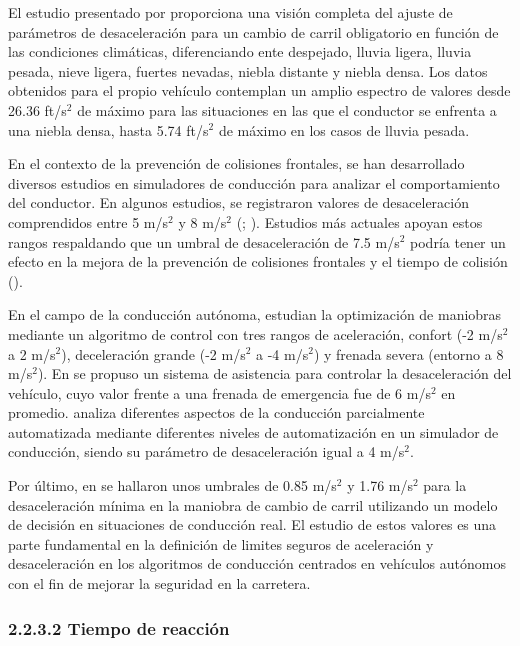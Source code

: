 El estudio presentado por \textcite{das} proporciona una visión completa del ajuste de parámetros de desaceleración para un cambio de carril obligatorio en función de las condiciones climáticas, diferenciando ente despejado, lluvia ligera, lluvia pesada, nieve ligera, fuertes nevadas, niebla distante y niebla densa. Los datos obtenidos para el propio vehículo contemplan un amplio espectro de valores desde 26.36 ft/s$^2$ de máximo para las situaciones en las que el conductor se enfrenta a una niebla densa, hasta 5.74 ft/s$^2$ de máximo en los casos de lluvia pesada. 

En el contexto de la prevención de colisiones frontales, se han desarrollado diversos estudios en simuladores de conducción para analizar el comportamiento del conductor. En algunos estudios, se registraron valores de desaceleración comprendidos entre 5 m/s$^2$ y 8 m/s$^2$ (\cite{ho}; \cite{bella}). Estudios más actuales apoyan estos rangos respaldando que un umbral de desaceleración de 7.5 m/s$^2$ podría tener un efecto en la mejora de la prevención de colisiones frontales y el tiempo de colisión (\cite{hang}).

En el campo de la conducción autónoma, \textcite{jeong} estudian la optimización de maniobras mediante un algoritmo de control con tres rangos de aceleración, confort (-2 m/s$^2$ a 2 m/s$^2$), deceleración grande (-2 m/s$^2$ a -4 m/s$^2$) y frenada severa (entorno a 8 m/s$^2$). En \textcite{saito} se propuso un sistema de asistencia para controlar la desaceleración del vehículo, cuyo valor frente a una frenada de emergencia fue de 6 m/s$^2$ en promedio. \textcite{naujoks18} analiza diferentes aspectos de la conducción parcialmente automatizada mediante diferentes niveles de automatización en un simulador de conducción, siendo su parámetro de desaceleración igual a 4 m/s$^2$. 

Por último, en \textcite{wang} se hallaron unos umbrales de 0.85 m/s$^2$ y 1.76 m/s$^2$ para la desaceleración mínima en la maniobra de cambio de carril utilizando un modelo de decisión en situaciones de conducción real. El estudio de estos valores es una parte fundamental en la definición de limites seguros de aceleración y desaceleración en los algoritmos de conducción centrados en vehículos autónomos con el fin de mejorar la seguridad en la carretera.

\subsubsection{2.2.3.2	Tiempo de reacción}


